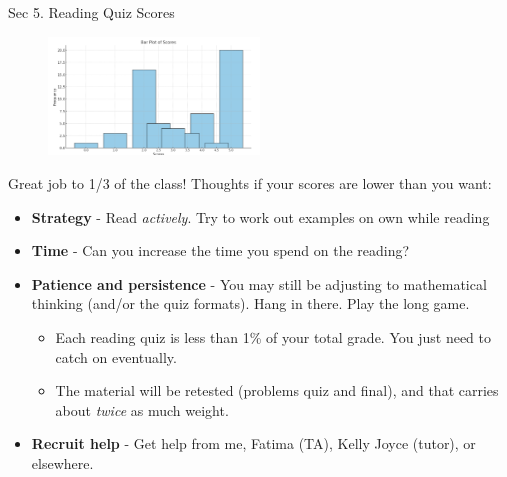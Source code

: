 \documentclass[10pt]{beamer}
\begin{document}
\begin{frame}{Sec 5. Reading Quiz Scores}

\begin{figure}
\includegraphics[width=0.5\textwidth]{images/sec5_scores.png}
\end{figure}
\footnotesize 
Great job to 1/3 of the class!
\vfill 
Thoughts if your scores are lower than you want:
\begin{itemize}
\item \textbf{Strategy} - Read \textit{actively}. Try to work out examples on own while reading
\item \textbf{Time} - Can you increase the time you spend on the reading? 
\item \textbf{Patience and persistence} - You may still be adjusting to mathematical thinking (and/or the quiz formats). Hang in there. Play the long game. 
	\begin{itemize}
	\footnotesize 
	\item Each reading quiz is less than 1\% of your total grade. You just need to catch on eventually. 
	\item The material will be retested (problems quiz and final), and that carries about \textit{twice} as much weight.
	\end{itemize}
\item \textbf{Recruit help} - Get help from me, Fatima (TA), Kelly Joyce (tutor), or elsewhere.
\end{itemize}

\end{frame}

%
%	
\end{document}
